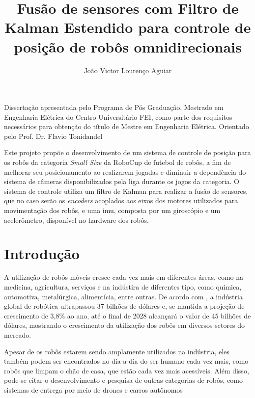 \documentclass[acronym, symbols, table]{fei}
\title{Fusão de sensores com Filtro de Kalman Estendido para controle de posição de robôs omnidirecionais}
\author{João Victor Lourenço Aguiar}
\begin{document}
	
\maketitle

\begin{folhaderosto}
	Dissertação apresentada pelo Programa de Pós Graduação, Mestrado em Engenharia Elétrica do Centro Universitário FEI, como parte dos requisitos necessários para obtenção do título de Mestre em Engenharia Elétrica. Orientado pelo Prof. Dr. Flavio Tonidandel
\end{folhaderosto}
	
\begin{resumo}

	Este projeto propõe o desenvolvimento de um sistema de controle de posição para os robôs da categoria \textit{Small Size} da RoboCup de futebol de robôs, a fim de melhorar seu posicionamento ao realizarem jogadas e diminuir a dependência do sistema de câmeras disponibilizados pela liga durante os jogos da categoria. O sistema de controle utiliza um filtro de Kalman para realizar a fusão de sensores, que no caso serão os \textit{encoders} acoplados aos eixos dos motores utilizados para movimentação dos robôs, e uma \acrshort{imu}, composta por um giroscópio e um acelerômetro, disponível no hardware dos robôs.

\end{resumo}

\listoffigures
\listoftables
\listofalgorithms
\printglossaries
\tableofcontents
\setcounter{table}{0}

\chapter{Introdução}

	A utilização de robôs móveis cresce cada vez mais em diferentes áreas, como na medicina, agricultura, serviços e na indústira de diferentes tipo, como química, automotiva, metalúrgica, alimentícia, entre outras. De acordo com \textcite{robotics_market}, a indústria global de robótica ultrapassou 37 bilhões de dólares e, se mantida a projeção de crescimento de 3,8\% ao ano, até o final de 2028 alcançará o valor de 45 bilhões de dólares, mostrando o crescimento da utilização dos robôs em diversos setores do mercado.
	
	Apesar de os robôs estarem sendo amplamente utilizados na indústria, eles também podem ser encontrados  no dia-a-dia do ser humano cada vez mais, como robôs que limpam o chão de casa, que estão cada vez mais acessíveis. Além disso, pode-se citar o desenvolvimento e pesquisa de outras categorias de robôs, como sistemas de entrega por meio de drones \cite{su14010360} e carros autônomos \cite{parekh2022review}
	
\end{document}
